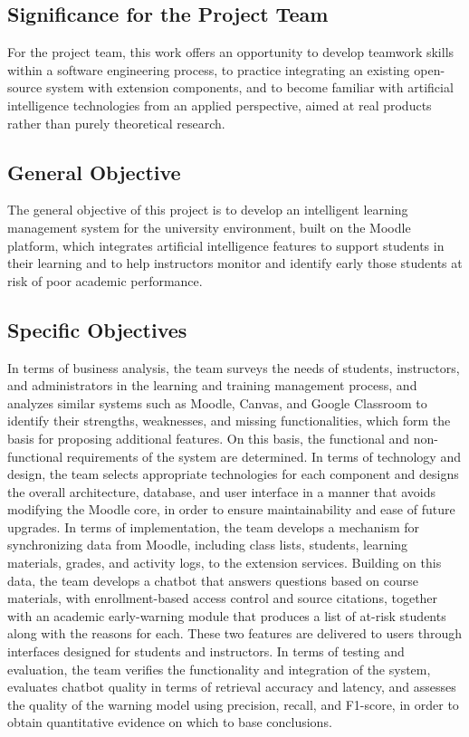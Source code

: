 \subsection{Significance for the Project Team}
For the project team, this work offers an opportunity to develop teamwork skills within a software engineering process, to practice integrating an existing open-source system with extension components, and to become familiar with artificial intelligence technologies from an applied perspective, aimed at real products rather than purely theoretical research.

\subsection{General Objective}
The general objective of this project is to develop an intelligent learning management system for the university environment, built on the Moodle platform, which integrates artificial intelligence features to support students in their learning and to help instructors monitor and identify early those students at risk of poor academic performance.

\subsection{Specific Objectives}
In terms of business analysis, the team surveys the needs of students, instructors, and administrators in the learning and training management process, and analyzes similar systems such as Moodle, Canvas, and Google Classroom to identify their strengths, weaknesses, and missing functionalities, which form the basis for proposing additional features. On this basis, the functional and non-functional requirements of the system are determined.
In terms of technology and design, the team selects appropriate technologies for each component and designs the overall architecture, database, and user interface in a manner that avoids modifying the Moodle core, in order to ensure maintainability and ease of future upgrades.
In terms of implementation, the team develops a mechanism for synchronizing data from Moodle, including class lists, students, learning materials, grades, and activity logs, to the extension services. Building on this data, the team develops a chatbot that answers questions based on course materials, with enrollment-based access control and source citations, together with an academic early-warning module that produces a list of at-risk students along with the reasons for each. These two features are delivered to users through interfaces designed for students and instructors.
In terms of testing and evaluation, the team verifies the functionality and integration of the system, evaluates chatbot quality in terms of retrieval accuracy and latency, and assesses the quality of the warning model using precision, recall, and F1-score, in order to obtain quantitative evidence on which to base conclusions.